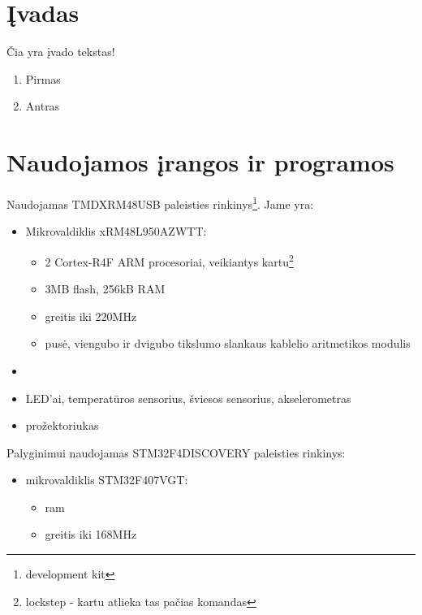 \documentclass[a4paper, 12pt]{article} %
\begin{document}
\begin{onehalfspacing}

\section*{\k{I}vadas} %


\v{C}ia yra \k{i}vado tekstas!

\begin{enumerate}[itemsep=12pt, parsep=-12pt] %
\item Pirmas
\item Antras
\end{enumerate}
\newpage

\section{Naudojamos \k{i}rangos ir programos}
Naudojamas TMDXRM48USB paleisties rinkinys\footnote{development kit}. Jame yra:
\begin{itemize}
\item Mikrovaldiklis xRM48L950AZWTT:
\begin{itemize}
\item 2 Cortex-R4F ARM procesoriai, veikiantys kartu\footnote{lockstep - kartu atlieka tas pa\v{c}ias komandas}
\item 3MB flash, 256kB RAM
\item greitis iki 220MHz
\item pus\.e, viengubo ir dvigubo tikslumo slankaus kablelio aritmetikos modulis
\end{itemize} 
\item 
\item LED'ai, temperat\=uros sensorius, \v{s}viesos sensorius, akselerometras
\item pro\v{z}ektoriukas
\end{itemize}
Palyginimui naudojamas STM32F4DISCOVERY paleisties rinkinys:
\begin{itemize}
\item mikrovaldiklis STM32F407VGT:
\begin{itemize}
\item ram
\item greitis iki 168MHz 
\end{itemize} 
\end{itemize}


\end{onehalfspacing}
\end{document}
